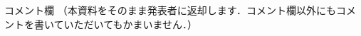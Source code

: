 \documentclass[a4j,10pt,dvipdfmx]{jarticle}
\begin{document}
\vfill
\noindent
{\gt コメント欄}
{\footnotesize
（本資料をそのまま発表者に返却します．コメント欄以外にもコメントを書いていただいてもかまいません．）}
\\
\fbox{\begin{minipage}{\textwidth}\noindent\\\\\end{minipage}}	
\end{document}

